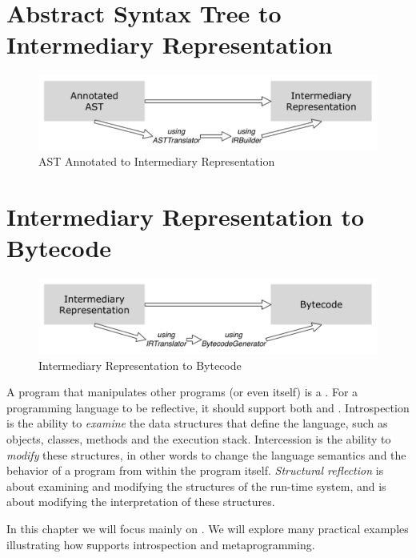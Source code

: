 \documentclass[a4paper,10pt,twoside]{book}
\begin{document}
\section{Abstract Syntax Tree to Intermediary Representation}

\begin{figure}[ht]\centering
	\includegraphics[width=\linewidth]{AnnotatedASTToIR}
	\caption{AST Annotated to Intermediary Representation }
\end{figure}

\section{Intermediary Representation to Bytecode}
\begin{figure}[ht]\centering
	\includegraphics[width=\linewidth]{IRToBytecode}
	\caption{Intermediary Representation to Bytecode }
\end{figure}
A program that manipulates other programs (or even itself) is a .
For a programming language to be reflective, it should support both  and .
Introspection is the ability to \emph{examine} the data structures that define the language, such as objects, classes, methods and the execution stack.
Intercession is the ability to \emph{modify} these structures, in other words to change the language semantics and the behavior of a program from within the program itself.
\emph{Structural reflection} is about examining and modifying the structures of the run-time system, and  is about modifying the interpretation of these structures.

In this chapter we will focus mainly on .
We will explore many practical examples illustrating how \st supports introspection and metaprogramming.

\ifx\wholebook\relax\else
   
   
\end{document}
